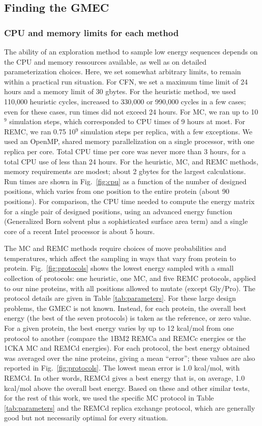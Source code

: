 \documentclass[a4paper,12pt]{article}
\begin{document}
\subsection{Finding the GMEC}
\subsubsection{CPU and memory limits for each method}
The ability of an exploration method to sample low energy sequences depends on the CPU and memory ressources
available, as well as on detailed parameterization choices. Here, we set somewhat arbitrary limits, to remain
within a practical run situation. For CFN, we set a maximum time limit of 24 hours and a memory limit of 30
gbytes. For the heuristic method, we used 110,000 heuristic cycles, increased to 330,000 or 990,000 cycles in a
few cases; even for these cases, run times did not exceed 24 hours. For MC, we ran up to 10$^9$ simulation steps,
which corresponded to CPU times of 9 hours at most. For REMC, we ran 0.75 10$^9$ simulation steps per replica,
with a few exceptions. We used an OpenMP, shared memory parallelization on a single processor, with one replica
per core. Total CPU time per core was never more than 3 hours, for a total CPU use of less than 24 hours. For the
heuristic, MC, and REMC methods, memory requirements are modest; about 2 gbytes for the largest calculations. Run
times are shown in Fig.\ \ref{fig:cpu} as a function of the number of designed positions, which varies from
one position to the entire protein (about 90 positions). For comparison, the CPU time needed to compute the
energy matrix for a single pair of designed positions, using an advanced energy function (Generalized Born
solvent plus a sophisticated surface area term) and a single core of a recent Intel processor is about 5 hours.

The MC and REMC methods require choices of move probabilities and temperatures, which affect the sampling in ways
that vary from protein to protein. Fig.\ \ref{fig:protocols} shows the lowest energy sampled with a small
collection of protocols: one heuristic, one MC, and five REMC protocols, applied to our nine proteins, with all
positions allowed to mutate (except Gly/Pro). The protocol details are given in Table \ref{tab:parameters}. For
these large design problems, the GMEC is not known. Instead, for each protein, the overall best energy (the best
of the seven protocols) is taken as the reference, or zero value. For a given protein, the best energy varies by
up to 12 kcal/mol from one protocol to another (compare the 1BM2 REMCa and REMCc energies or the 1CKA MC and REMCd
energies). For each protocol, the best energy obtained was averaged over the nine proteins, giving a mean ``error'';
these values are also reported in Fig.\ \ref{fig:protocols}. The lowest mean error is 1.0 kcal/mol, with REMCd. In
other words, REMCd gives a best energy that is, on average, 1.0 kcal/mol above the overall best energy. Based on
these and other similar tests, for the rest of this work, we used the specific MC protocol in Table \ref{tab:parameters}
and the REMCd replica exchange protocol, which are generally good but not necessarily optimal for every situation. 
\end{document}
